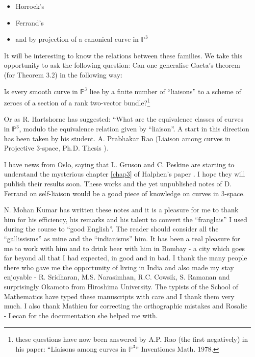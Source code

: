 \begin{itemize}
\item Horrock's
\item Ferrand's
\item and by projection of a canonical curve in $\mathbb{P}^3$
\end{itemize}

It will be interesting to know the relations between these
families. We take this opportunity to ask the following question: Can
one generalise Gaeta's theorem (for \eg \cite{key11} Theorem 3.2) in
the following way:

Is every smooth curve in $\mathbb{P}^3$ liee by a finite number of
``liaisons'' to a scheme of zeroes of a section of a rank two-vector
bundle?\footnote{these questions have now been answered by A.P. Rao
(the first negatively) in his paper: ``Liaisons among curves in
$\mathbb{P}^3$'' Inventiones Math. 1978.}

Or as R. Hartshorne has suggested: ``What are the equivalence
{\small classes} of curves in $\mathbb{P}^3$, modulo the equivalence relation
given by ``liaison''. A start in this direction has been taken by his
student. A. Prabhakar Rao (Liaison among curves in Projective 3-space,
Ph.D. Thesis \cite{key13}).\footnotemark[\thefootnote]

I have news from Oslo, saying that L. Gruson and C. Peskine are
starting to understand the mysterious chapter \ref{chap3} of Halphen's
paper \cite{key5}. I hope they will publish their results soon. These
works and the yet unpublished notes of D. Ferrand on self-liaison
would be a good piece of knowledge on curves in 3-space.

N. Mohan Kumar has written these notes and it is a pleasure for me to
thank him for his efficiency, his remarks and his talent to convert
the ``franglais'' I used during the course to ``good English''. The
reader should consider all the ``gallissisms'' as mine and the
``indianisms'' him. It has been a real pleasure for me to work with
him and to drink beer with him in Bombay - a city which
goes far beyond all that I had expected, in good and in
bad. I thank the many people there who gave me the opportunity of
living in India and also made my stay enjoyable - R. Sridharan,
M.S. Narasimhan, R.C. Cowsik, S. Ramanan and surprisingly Okamoto from
Hiroshima University. The typists of the School of Mathematics have
typed these manuscripts with care and I thank them very much. I also
thank Mathieu for correcting the orthographic mistakes and Rosalie -
Lecan for the documentation she helped me with.

